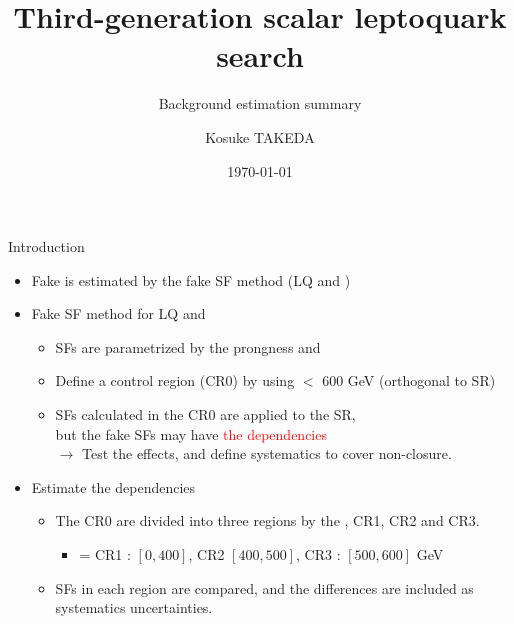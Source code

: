 \documentclass[aspectratio=46, dvipdfmx, 10pt, t]{beamer} %
\title{Third-generation scalar leptoquark search}
\subtitle{Background estimation summary}
\author{Kosuke TAKEDA}
\institute{Kobe University}
\date{\today}
\begin{document}
\frame[plain]{\titlepage}


\begin{frame}{Introduction}
  \vspace{5mm}
  \begin{itemize}
    \item Fake \ttbar is estimated by the fake SF method (LQ \lephad and \hadhad)
    \item Fake \tauhad SF method for LQ \lephad and \hadhad
      \begin{itemize}
        \item SFs are parametrized by the prongness and \tauhad \pT
        \item Define a control region (CR0) by using \sT $<$ 600 GeV (orthogonal to SR)
        \item SFs calculated in the CR0 are applied to the SR,  \\
          but the fake SFs may have \textcolor{red}{the \sT dependencies} \\
              $\to$ Test the effects, and define systematics to cover non-closure.
      \end{itemize}
      \hspace{5mm}

    \item Estimate the \sT dependencies
      \begin{itemize}
        \item The CR0 are divided into three regions by the \sT, CR1, CR2 and CR3.
          \begin{itemize}
            \item \sT = CR1 : $[0, 400]$, CR2 $[400, 500]$, CR3 : $[500,600]$ GeV
          \end{itemize}
        \item SFs in each region are compared, and the differences are included as systematics uncertainties.
      \end{itemize}
      \hspace{5mm}

  \end{itemize}
\end{frame}

\end{document}
